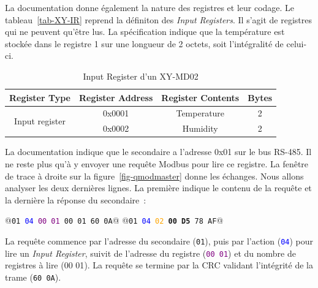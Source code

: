     \vspace{1em}

La documentation donne également la nature des registres et leur codage. Le tableau~\vref{tab-XY-IR} reprend la définiton des \textit{Input Registers}. Il s'agit de registres qui ne peuvent qu'être lus. La spécification indique que la température est stockée dans le registre 1 sur une longueur de 2 octets, soit l'intégralité de celui-ci.

\begin{table}
\begin{center}
\begin{tabular}{|c|c|c|c|}
\hline
 \rowcolor{purple!10} Register Type & Register Address & Register Contents & Bytes \\ \hline \hline
 \multirow{2}{*}{Input register} & 0x0001 & Temperature & 2 \\ \cline{2-4}
                                 & 0x0002 & Humidity & 2 \\  \hline
\end{tabular}
\end{center}
\caption{Input Register d'un XY-MD02}
\label{tab-XY-IR}
\end{table}

    \vspace{1em}

La documentation indique que le secondaire a l'adresse 0x01 sur le bus RS-485. Il ne reste plus qu'à y envoyer une requête Modbus pour lire ce registre. La fenêtre de trace à droite sur la figure~\vref{fig-qmodmaster} donne les échanges. Nous allons analyser les deux dernières lignes. La première indique le contenu de la requête et la dernière la réponse du secondaire~:

\begin{termc}[backgroundcolor=\color{backcolour}, escapechar=@]
@\texttt{01 \textcolor{blue}{04} \textcolor{purple}{00 01} \textcolor{green!60!black}{00 01} \textcolor{black!30}{60 0A}}@
@\texttt{01 \textcolor{blue}{04} \textcolor{orange}{02} \textbf{00 D5} \textcolor{black!30}{78 AF}}@
\end{termc}

La requête commence par l'adresse du secondaire (\texttt{01}), puis par l'action (\texttt{\textcolor{blue}{04}}) pour lire un \textit{Input Register}, suivit de l'adresse du registre (\texttt{\textcolor{purple}{00 01}}) et du nombre de registres à lire (\textcolor{green!60!black}{00 01}). La requête se termine par la \ac{CRC} validant l'intégrité de la trame (\texttt{\textcolor{black!30}{60 0A}}).

